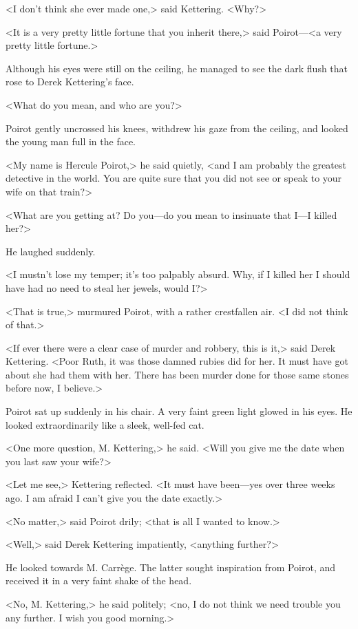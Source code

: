 <I don't think she ever made one,> said Kettering. <Why?>

<It is a very pretty little fortune that you inherit there,> said Poirot—<a very pretty little fortune.>

Although his eyes were still on the ceiling, he managed to see the dark flush that rose to Derek Kettering's face.

<What do you mean, and who are you?>

Poirot gently uncrossed his knees, withdrew his gaze from the ceiling, and looked the young man full in the face.

<My name is Hercule Poirot,> he said quietly, <and I am probably the greatest detective in the world. You are quite sure that you did not see or speak to your wife on that train?>

<What are you getting at? Do you—do you mean to insinuate that I—I killed her?>

He laughed suddenly.

<I mustn't lose my temper; it's too palpably absurd. Why, if I killed her I should have had no need to steal her jewels, would I?>

<That is true,> murmured Poirot, with a rather crestfallen air. <I did not think of that.>

<If ever there were a clear case of murder and robbery, this is it,> said Derek Kettering. <Poor Ruth, it was those damned rubies did for her. It must have got about she had them with her. There has been murder done for those same stones before now, I believe.>

Poirot sat up suddenly in his chair. A very faint green light glowed in his eyes. He looked extraordinarily like a sleek, well-fed cat.

<One more question, M. Kettering,> he said. <Will you give me the date when you last saw your wife?>

<Let me see,> Kettering reflected. <It must have been—yes over three weeks ago. I am afraid I can't give you the date exactly.>

<No matter,> said Poirot drily; <that is all I wanted to know.>

<Well,> said Derek Kettering impatiently, <anything further?>

He looked towards M. Carrège. The latter sought inspiration from Poirot, and received it in a very faint shake of the head.

<No, M. Kettering,> he said politely; <no, I do not think we need trouble you any further. I wish you good morning.>

